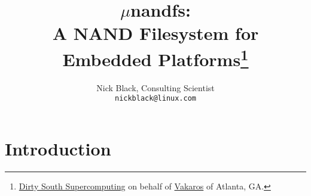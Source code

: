 \documentclass[letterpaper,10pt]{article}
\title{$\mu$nandfs:\\
A NAND Filesystem for Embedded Platforms\thanks{
 \href{https://www.dsscaw.com/}{Dirty South Supercomputing} on behalf
 of \href{https://www.vakaros.com/}{Vakaros} of Atlanta, GA.
}\\
}
\author{Nick Black, Consulting Scientist\\
\texttt{nickblack@linux.com}
}
\begin{document}
\maketitle
\thispagestyle{fancy}
\date{}
\begin{abstract}
\setlength{\parindent}{0pt}
\end{abstract}
\section{Introduction}
\printbibliography
\end{document}
